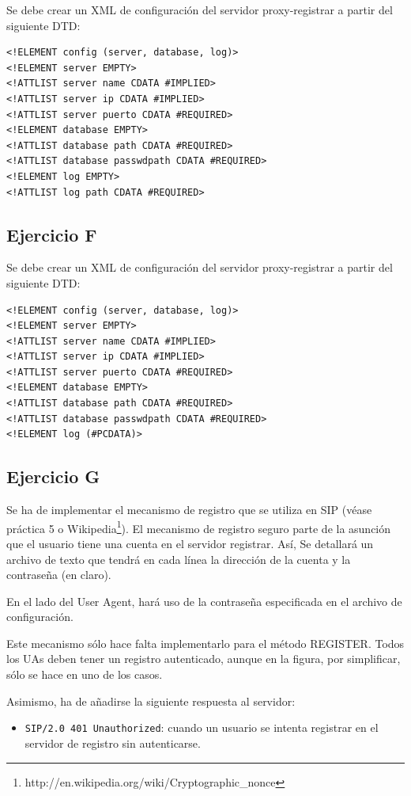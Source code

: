 \documentclass[a4paper,11pt]{article}
\begin{document}
Se debe crear un XML de configuración del servidor proxy-registrar a partir del siguiente DTD:

\begin{verbatim}
<!ELEMENT config (server, database, log)>
<!ELEMENT server EMPTY>
<!ATTLIST server name CDATA #IMPLIED>
<!ATTLIST server ip CDATA #IMPLIED>
<!ATTLIST server puerto CDATA #REQUIRED>
<!ELEMENT database EMPTY>
<!ATTLIST database path CDATA #REQUIRED>
<!ATTLIST database passwdpath CDATA #REQUIRED>
<!ELEMENT log EMPTY>
<!ATTLIST log path CDATA #REQUIRED>
\end{verbatim}

\subsection{Ejercicio F}

Se debe crear un XML de configuración del servidor proxy-registrar a partir del siguiente DTD:

\begin{verbatim}
<!ELEMENT config (server, database, log)>
<!ELEMENT server EMPTY>
<!ATTLIST server name CDATA #IMPLIED>
<!ATTLIST server ip CDATA #IMPLIED>
<!ATTLIST server puerto CDATA #REQUIRED>
<!ELEMENT database EMPTY>
<!ATTLIST database path CDATA #REQUIRED>
<!ATTLIST database passwdpath CDATA #REQUIRED>
<!ELEMENT log (#PCDATA)>
\end{verbatim}

\subsection{Ejercicio G}

Se ha de implementar el mecanismo de registro que se utiliza en SIP (véase práctica 5 o Wikipedia\footnote{http://en.wikipedia.org/wiki/Cryptographic\_nonce}). El mecanismo de registro seguro parte de la asunción que el usuario tiene una cuenta en el servidor registrar. Así, Se detallará un archivo de texto que tendrá en cada línea la dirección de la cuenta y la contraseña (en claro). 

En el lado del User Agent, hará uso de la contraseña especificada en el archivo de configuración.

Este mecanismo sólo hace falta implementarlo para el método REGISTER.
Todos los UAs deben tener un registro autenticado, aunque en la figura, por simplificar, sólo se hace en uno de los casos.

Asimismo, ha de añadirse la siguiente respuesta al servidor:
\begin{itemize}
     \item \texttt{SIP/2.0 401 Unauthorized}: cuando un usuario se intenta registrar en el servidor de registro sin autenticarse.
\end{itemize}
\end{document}
